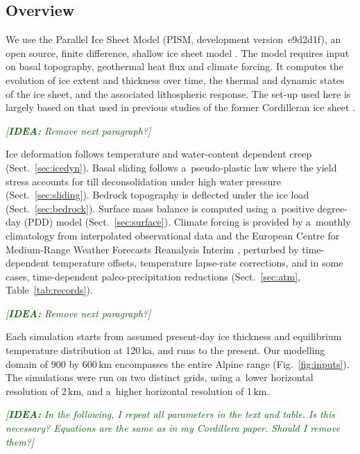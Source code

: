\documentclass{article}
\newcommand{\idea}[1]{\textcolor{darkgreen}{\emph{[\textbf{IDEA:} #1]}}}
\newcommand{\unit}[1]{\ensuremath{\mathrm{#1}}}
\begin{document}
\subsection{Overview}
\label{sec:overview}%

    We use the Parallel Ice Sheet Model (PISM, development version~e9d2d1f), an
    open source, finite difference, shallow ice sheet model
    \citep{PISM-authors.2017}. The model requires input on basal
    topography, geothermal heat flux and climate forcing. It computes the
    evolution of ice extent and thickness over time, the thermal and dynamic
    states of the ice sheet, and the associated lithospheric response. The
    set-up used here is largely based on that used in previous studies of the
    former Cordilleran ice sheet \citep{Seguinot.2014, Seguinot.etal.2014,
    Seguinot.etal.2016}.

    \idea{Remove next paragraph?}

    Ice deformation follows temperature and water-content dependent creep
    (Sect.~\ref{sec:icedyn}). Basal sliding follows a~pseudo-plastic law where
    the yield stress accounts for till deconsolidation under high water
    pressure (Sect.~\ref{sec:sliding}). Bedrock topography is deflected
    under the ice load (Sect.~\ref{sec:bedrock}). Surface mass balance is
    computed using a~positive degree-day (PDD) model (Sect.~\ref{sec:surface}).
    Climate forcing is provided by a~monthly climatology from interpolated
    observational data \citep[WorldClim;][]{Hijmans.etal.2005} and the European
    Centre for Medium-Range Weather Forecasts Reanalysis Interim
    \citep[ERA-Interim;][]{Dee.etal.2011}, perturbed by time-dependent
    temperature offsets, temperature lapse-rate corrections, and in some cases,
    time-dependent paleo-precipitation reductions (Sect.~\ref{sec:atm},
    Table~\ref{tab:records}).

    \idea{Remove next paragraph?}

    Each simulation starts from assumed present-day ice thickness and
    equilibrium temperature distribution at 120\,\unit{ka}, and runs to the
    present. Our modelling domain of 900 by 600\,\unit{km} encompasses the
    entire Alpine range (Fig.~\ref{fig:inputs}). The simulations were run on
    two distinct grids, using a~lower horizontal resolution of 2\,\unit{km},
    and a~higher horizontal resolution of 1\,\unit{km}.

    \idea{In the following, I repeat all parameters in the text and table. Is
          this necessary? Equations are the same as in my Cordillera paper.
          Should I remove them?}
\end{document}
